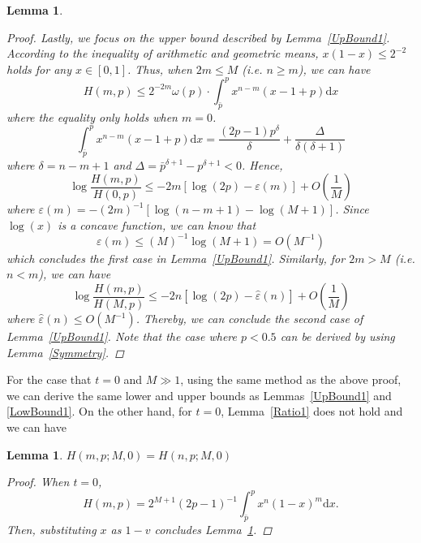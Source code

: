 \documentclass{article}
\newtheorem{lemma}[theorem]{Lemma}
\begin{document}
\begin{lemma}
\begin{proof}
Lastly, we focus on the upper bound described by Lemma~\ref{UpBound1}. According to the inequality of arithmetic and geometric means, $x(1-x)\leq 2^{-2}$ holds for any $x\in [0,1]$. Thus, when $2m\leq M$ (i.e. $n\geq m$), we can have
\begin{equation}
H(m,p)\leq 2^{-2m}\omega(p)\cdot \int_{\bar{p}}^{p}x^{n-m}(x-1+p)\mathrm{d}x
\end{equation}
where the equality only holds when $m=0$.
\begin{equation}
 \int_{\bar{p}}^{p}x^{n-m}(x-1+p)\mathrm{d}x=\frac{(2p-1)p^{\delta}}{\delta}+\frac{\Delta}{\delta(\delta+1)}
\end{equation}
where $\delta=n-m+1$ and $\Delta=\bar{p}^{\delta+1}-p^{\delta+1}<0$. Hence,
\begin{equation}
\log\frac{H(m,p)}{H(0,p)}\leq -2m[\log(2p)-\varepsilon(m)] + O\left(\frac{1}{M}\right)
\end{equation}
where $\varepsilon(m)=-(2m)^{-1}[\log(n-m+1)-\log(M+1)]$. Since $\log(x)$ is a concave function, we can know that
\begin{equation}
\varepsilon(m)\leq (M)^{-1}\log(M+1)=O\left(M^{-1}\right)
\end{equation}
which concludes the first case in Lemma~\ref{UpBound1}. Similarly, for $2m>M$ (i.e. $n<m$), we can have
\begin{equation}
\log\frac{H(m,p)}{H(M,p)}\leq -2n[\log(2p)-\hat{\varepsilon}(n)] + O\left(\frac{1}{M}\right)
\end{equation}
where $\hat{\varepsilon}(n)\leq O(M^{-1})$. Thereby, we can conclude the second case of Lemma~\ref{UpBound1}. Note that the case where $p<0.5$ can be derived by using Lemma~\ref{Symmetry}.
\end{proof}
\end{lemma}
For the case that $t=0$ and $M\gg 1$, using the same method as the above proof, we can derive the same lower and upper bounds as Lemmas~\ref{UpBound1} and \ref{LowBound1}. On the other hand, for $t=0$, Lemma~\ref{Ratio1} does not hold and we can have
\begin{lemma}
\label{Ratio0}
$H(m,p;M,0)=H(n,p;M,0)$
\begin{proof}
When $t=0$,
\begin{equation}
H(m,p)=2^{M+1}(2p-1)^{-1}\int_{\bar{p}}^{p}x^n(1-x)^m\mathrm{d}x.
\end{equation}
Then, substituting $x$ as $1-v$ concludes Lemma~\ref{Ratio0}.
\end{proof}
\end{lemma}
\end{document}
